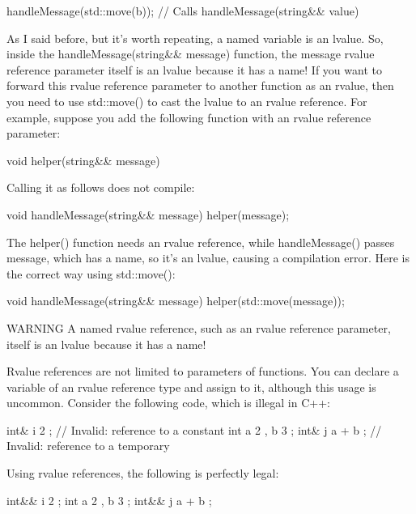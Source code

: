 \begin{cpp}
handleMessage(std::move(b)); // Calls handleMessage(string&& value)
\end{cpp}

As I said before, but it’s worth repeating, a named variable is an lvalue. So, inside the handleMessage(string\&\& message) function, the message rvalue reference parameter itself is an lvalue because it has a name! If you want to forward this rvalue reference parameter to another function as an rvalue, then you need to use std::move() to cast the lvalue to an rvalue reference. For example, suppose you add the following function with an rvalue reference parameter:

\begin{cpp}
void helper(string&& message) { }
\end{cpp}

Calling it as follows does not compile:

\begin{cpp}
void handleMessage(string&& message) { helper(message); }
\end{cpp}

The helper() function needs an rvalue reference, while handleMessage() passes message, which has a name, so it’s an lvalue, causing a compilation error. Here is the correct way using std::move():

\begin{cpp}
void handleMessage(string&& message) { helper(std::move(message)); }
\end{cpp}

\begin{myWarning}{WARNING}
A named rvalue reference, such as an rvalue reference parameter, itself is an lvalue because it has a name!
\end{myWarning}

Rvalue references are not limited to parameters of functions. You can declare a variable of an rvalue reference type and assign to it, although this usage is uncommon. Consider the following code, which is illegal in C++:

\begin{cpp}
int& i { 2 }; // Invalid: reference to a constant
int a { 2 }, b { 3 };
int& j { a + b }; // Invalid: reference to a temporary
\end{cpp}

Using rvalue references, the following is perfectly legal:

\begin{cpp}
int&& i { 2 };
int a { 2 }, b { 3 };
int&& j { a + b };
\end{cpp}

